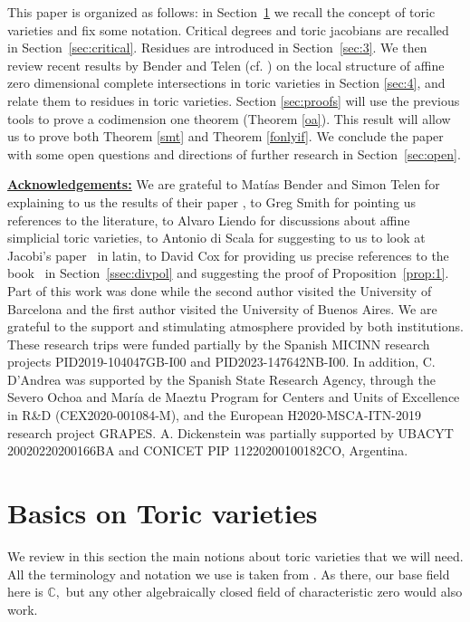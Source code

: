 \documentclass[a4paper,11pt]{amsart}
\newcommand{\C}{\mathbb{C}}
\numberwithin{thm}{section}
\numberwithin{equation}{section}
\theoremstyle{definition}
\theoremstyle{plain}
\begin{document}
This paper is organized as follows: in Section~\ref{sec:1} we recall the concept of  toric varieties and fix some notation. Critical degrees and toric jacobians are recalled in Section~\ref{sec:critical}. Residues are introduced in Section~\ref{sec:3}. We then review recent results by Bender and Telen (cf. \cite{BT22}) on the local structure of affine zero dimensional complete intersections in toric varieties in Section \ref{sec:4}, and relate them to residues in toric varieties.   Section \ref{sec:proofs} will use the previous tools to prove a codimension one theorem (Theorem \ref{oa}). This result will allow us to prove both Theorem \ref{smt}  and Theorem \ref{fonlyif}. We conclude the paper with some open questions and directions of further research in Section~\ref{sec:open}.
 
 \medskip
\noindent\underline{\bf Acknowledgements:}
We are grateful to Mat\'ias Bender and Simon Telen for explaining to us the results of their paper \cite{BT22}, to Greg Smith for pointing us  references to the literature, to Alvaro Liendo for discussions about affine simplicial toric varieties, to Antonio di Scala for suggesting to us to look at Jacobi's paper~\cite{Jacobi} in latin,  to David Cox for 
providing us  precise references to the book~\cite{CLS11} in Section~\ref{ssec:divpol} and suggesting the proof of Proposition~\ref{prop:1}.
Part of this work was done while the second author visited the University of Barcelona
and the first author visited the University of Buenos Aires. 
 We are grateful to the support and stimulating atmosphere provided by both institutions. These research trips were funded partially by the Spanish MICINN research projects  PID2019-104047GB-I00 and PID2023-147642NB-I00. In addition, C. D'Andrea was supported by the Spanish State Research Agency, through the Severo Ochoa and Mar\'ia de Maeztu Program for Centers and Units of Excellence in R\&D (CEX2020-001084-M), and the European  H2020-MSCA-ITN-2019 research project GRAPES. 
A. Dickenstein was partially supported by UBACYT 20020220200166BA and CONICET PIP 11220200100182CO, Argentina.


\bigskip
\section{Basics on Toric varieties}\label{sec:1}
We review in this section the main notions about toric varieties that we will need. All the terminology and notation we use is taken from \cite{CLS11}. As there, our base field here is $\C,$ but any other algebraically closed field of characteristic zero would also work. 
\end{document}

